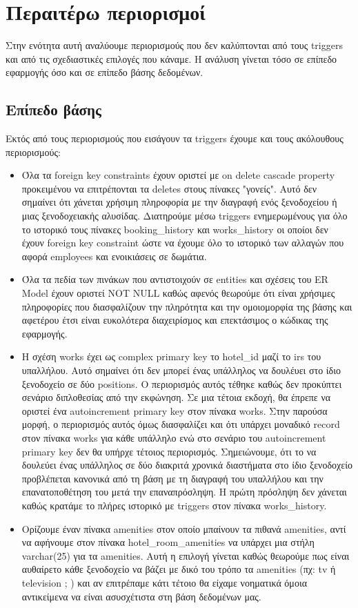 \documentclass[a4paper,oneside, 11pt]{article}
\begin{document}
\section{Περαιτέρω περιορισμοί}
Στην ενότητα αυτή αναλύουμε περιορισμούς που δεν καλύπτονται από τους triggers και από τις σχεδιαστικές επιλογές που κάναμε. Η ανάλυση γίνεται τόσο σε επίπεδο εφαρμογής όσο και σε επίπεδο βάσης δεδομένων.
\subsection{Επίπεδο βάσης}
Εκτός από τους περιορισμούς που εισάγουν τα triggers έχουμε και τους ακόλουθους περιορισμούς:
\begin{itemize}
\item Όλα τα foreign key constraints έχουν οριστεί με on delete cascade property προκειμένου να επιτρέπονται τα deletes στους πίνακες "γονείς". Αυτό δεν σημαίνει ότι χάνεται χρήσιμη πληροφορία με την διαγραφή ενός ξενοδοχείου ή μιας ξενοδοχειακής αλυσίδας. Διατηρούμε μέσω triggers ενημερωμένους για όλο το ιστορικό τους πίνακες booking\_history και works\_history οι οποίοι δεν έχουν foreign key constraint ώστε να έχουμε όλο το ιστορικό των αλλαγών που αφορά employees και ενοικιάσεις σε δωμάτια.
\item Όλα τα πεδία των πινάκων που αντιστοιχούν σε entities και σχέσεις του ER Model έχουν οριστεί NOT NULL καθώς αφενός θεωρούμε ότι είναι χρήσιμες πληροφορίες που διασφαλίζουν την πληρότητα και την ομοιομορφία της βάσης και αφετέρου έτσι είναι ευκολότερα διαχειρίσμος και επεκτάσιμος ο κώδικας της εφαρμογής.
\item Η σχέση works έχει ως complex primary key το hotel\_id μαζί το irs του υπαλλήλου. Αυτό σημαίνει ότι δεν μπορεί ένας υπάλληλος να δουλέυει στο ίδιο ξενοδοχείο σε δύο positions. Ο περιορισμός αυτός τέθηκε καθώς δεν προκύπτει σενάριο διπλοθεσίας από την εκφώνηση. Σε μια τέτοια εκδοχή, θα έπρεπε να οριστεί ένα autoincrement primary key στον πίνακα works. Στην παρούσα μορφή, ο περιορισμός αυτός όμως διασφαλίζει και ότι υπάρχει μοναδικό record στον πίνακα works για κάθε υπάλληλο ενώ στο σενάριο του autoincrement primary key δεν θα υπήρχε τέτοιος περιορισμός. Σημειώνουμε, ότι το να δουλεύει ένας υπάλληλος σε δύο διακριτά χρονικά διαστήματα στο ίδιο ξενοδοχείο προβλέπεται κανονικά από τη βάση με τη διαγραφή του υπαλλήλου και την επανατοποθέτηση του μετά την επαναπρόσληψη. Η πρώτη πρόσληψη δεν χάνεται καθώς κρατάμε το πλήρες ιστορικό με triggers στον πίνακα works\_history. 
\item Ορίζουμε έναν πίνακα amenities στον οποίο μπαίνουν τα πιθανά amenities, αντί να αφήνουμε στον πίνακα hotel\_room\_amenities να υπάρχει μια στήλη varchar(25) για τα amenities. Αυτή η επιλογή γίνεται καθώς θεωρούμε πως είναι αυθαίρετο κάθε ξενοδοχείο να βάζει με δικό του τρόπο τα amenities (πχ: tv ή television ; ) και αν επιτρέπαμε κάτι τέτοιο θα είχαμε νοηματικά όμοια αντικείμενα να είναι ασυσχέτιστα στη βάση δεδομένων μας.
\end{itemize}
\end{document}
